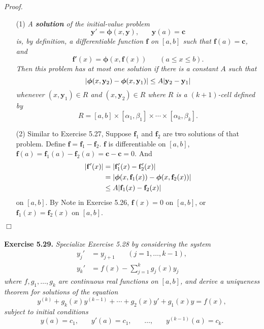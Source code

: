 \documentclass{article}
\begin{document}
\emph{Proof.}
\begin{enumerate}
\item[(1)]
\emph{A \textbf{solution} of the initial-value problem
\[
  \mathbf{y}' = \bm{\phi}(x,\mathbf{y}), \:\:\:\:\:\:\:\:
  \mathbf{y}(a) = \mathbf{c}
\]
is, by definition, a differentiable function $\mathbf{f}$ on $[a,b]$
such that $\mathbf{f}(a) = \mathbf{c}$, and
\[
  \mathbf{f}'(x) = \bm{\phi}(x,\mathbf{f}(x)) \:\:\:\:\:\:\:\: (a \leq x \leq b).
\]
Then this problem has at most one solution if there is a constant $A$ such that
\[
  \abs{ \bm{\phi}(x,\mathbf{y}_2) - \bm{\phi}(x,\mathbf{y}_1) }
  \leq A \abs{ \mathbf{y}_2 - \mathbf{y}_1 }
\]
whenever $(x,\mathbf{y}_1) \in R$ and $(x,\mathbf{y}_2) \in R$
where $R$ is a $(k+1)$-cell defined by
\[
  R = [a,b] \times [\alpha_1,\beta_1] \times \cdots \times [\alpha_k,\beta_k].
\]}
\item[(2)]
Similar to Exercise 5.27,
Suppose $\mathbf{f}_1$ and $\mathbf{f}_2$ are two solutions of that problem.
Define $\mathbf{f} = \mathbf{f}_1 - \mathbf{f}_2$.
$\mathbf{f}$ is differentiable on $[a,b]$,
$\mathbf{f}(a) = \mathbf{f}_1(a) - \mathbf{f}_2(a) = \mathbf{c} - \mathbf{c} = 0$.
And
\begin{align*}
  |\mathbf{f}'(x)|
  &= |\mathbf{f}_1'(x) - \mathbf{f}_2'(x)| \\
  &= \abs{ \bm{\phi}(x,\mathbf{f}_1(x)) - \bm{\phi}(x,\mathbf{f}_2(x)) } \\
  &\leq A | \mathbf{f}_1(x) - \mathbf{f}_2(x) |
\end{align*}
on $[a,b]$.
By Note in Exercise 5.26,
$\mathbf{f}(x) = 0$ on $[a,b]$, or $\mathbf{f}_1(x) = \mathbf{f}_2(x)$ on $[a,b]$.
\end{enumerate}
$\Box$ \\\\






\textbf{Exercise 5.29.}
\emph{Specialize Exercise 5.28 by considering the system
\begin{align*}
  y_j' &= y_{j+1} \:\:\:\:\:\:\:\: (j = 1, \ldots, k-1), \\
  y_k' &= f(x) - \sum_{j=1}^{k}{g_j(x)y_j}
\end{align*}
where $f, g_1, \ldots, g_k$ are continuous real functions on $[a,b]$,
and derive a uniqueness theorem for solutions of the equation
\[
  y^{(k)} + g_k(x)y^{(k-1)} + \cdots + g_2(x)y' + g_1(x)y = f(x),
\]
  subject to initial conditions
\[
  y(a) = c_1, \:\:\:\:\:\:\:\:
  y'(a) = c_1, \:\:\:\:\:\:\:\:
  \ldots, \:\:\:\:\:\:\:\:
  y^{(k-1)}(a) = c_k.
\]}
\end{document}
